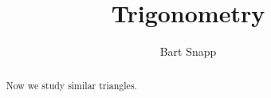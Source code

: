 \documentclass[handout,nooutcomes,noauthor]{ximera}
\title{Trigonometry}
\author{Bart Snapp}
\begin{document}
\begin{abstract}
  Now we study similar triangles.
\end{abstract}
\maketitle


\begin{listSectionOutcomes}
\item 
\end{listSectionOutcomes}
\end{document}

